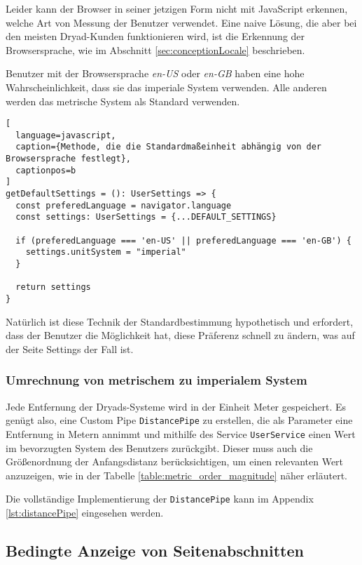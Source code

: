 Leider kann der Browser in seiner jetzigen Form nicht mit JavaScript erkennen, welche Art von Messung der Benutzer verwendet.
Eine naive Lösung, die aber bei den meisten Dryad-Kunden funktionieren wird, ist die Erkennung der Browsersprache, wie im Abschnitt \ref{sec:conceptionLocale} beschrieben.

Benutzer mit der Browsersprache \textit{en-US} oder \textit{en-GB} haben eine hohe Wahrscheinlichkeit, dass sie das imperiale System verwenden.
Alle anderen werden das metrische System als Standard verwenden.

\begin{lstlisting}[
  language=javascript,
  caption={Methode, die die Standardmaßeinheit abhängig von der Browsersprache festlegt},
  captionpos=b
]
getDefaultSettings = (): UserSettings => {
  const preferedLanguage = navigator.language
  const settings: UserSettings = {...DEFAULT_SETTINGS}

  if (preferedLanguage === 'en-US' || preferedLanguage === 'en-GB') {
    settings.unitSystem = "imperial"
  }

  return settings
}
\end{lstlisting}

Natürlich ist diese Technik der Standardbestimmung hypothetisch und erfordert, dass der Benutzer die Möglichkeit hat, diese Präferenz schnell zu ändern, was auf der Seite Settings der Fall ist.

\subsubsection{Umrechnung von metrischem zu imperialem System}

Jede Entfernung der Dryads-Systeme wird in der Einheit Meter gespeichert.
Es genügt also, eine Custom Pipe \lstinline{DistancePipe} zu erstellen, die als Parameter eine Entfernung in Metern annimmt und mithilfe des Service \lstinline{UserService} einen Wert im bevorzugten System des Benutzers zurückgibt.
Dieser muss auch die Größenordnung der Anfangsdistanz berücksichtigen, um einen relevanten Wert anzuzeigen, wie in der Tabelle \ref{table:metric_order_magnitude} näher erläutert.

Die vollständige Implementierung der \lstinline{DistancePipe} kann im Appendix \ref{lst:distancePipe} eingesehen werden.

\subsection{Bedingte Anzeige von Seitenabschnitten}

